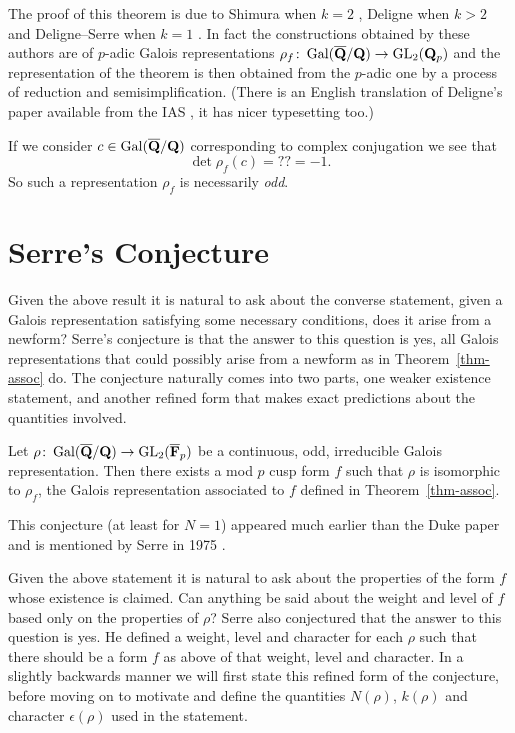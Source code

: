 \documentclass[a4paper,12pt]{article}
\begin{document}
The proof of this theorem is due to Shimura when $k = 2$ \cite{Shimura}, Deligne when $k > 2$ \cite{Deligne} and Deligne--Serre when $k = 1$ \cite{DeligneSerre}.
In fact the constructions obtained by these authors are of $p$-adic Galois representations $\rho_f\colon \operatorname{Gal}(\overline{\mathbf{Q}}/\mathbf{Q}) \to \operatorname{GL}_2(\mathbf{Q}_p)$ and the representation of the theorem is then obtained from the $p$-adic one by a process of reduction and semisimplification. %
(There is an English translation of Deligne's paper available from the IAS \cite{DeligneEng}, it has nicer typesetting too.) %

If we consider $c\in \operatorname{Gal}(\overline{\mathbf{Q}}/\mathbf{Q})$ corresponding to complex conjugation we see that
\[
\det\rho_f(c) = ?? = -1.%
\]
So such a representation $\rho_f$ is necessarily \emph{odd}.



\section{Serre's Conjecture}
Given the above result it is natural to ask about the converse statement, given a Galois representation satisfying some necessary conditions, does it arise from a newform?
Serre's conjecture is that the answer to this question is yes, all Galois representations that could possibly arise from a newform as in Theorem~\ref{thm-assoc} do.
The conjecture naturally comes into two parts, one weaker existence statement, and another refined form that makes exact predictions about the quantities involved.

\begin{conjecture}\label{conj-qual}
Let $\rho\colon \operatorname{Gal}(\overline{\mathbf{Q}}/\mathbf{Q}) \to \operatorname{GL}_2(\overline{\mathbf{F}}_p)$ be a continuous, odd, irreducible Galois representation.
Then there exists a mod $p$ cusp form $f$ such that $\rho$ is isomorphic to $\rho_f$, the Galois representation associated to $f$ defined in Theorem~\ref{thm-assoc}.
\end{conjecture}

This conjecture (at least for $N = 1$) appeared much earlier than the Duke paper and is mentioned by Serre in 1975 \cite{Serre75}.


Given the above statement it is natural to ask about the properties of the form $f$ whose existence is claimed.
Can anything be said about the weight and level of $f$ based only on the properties of $\rho$?
Serre also conjectured that the answer to this question is yes.
He defined a weight, level and character for each $\rho$ such that there should be a form $f$ as above of that weight, level and character.
In a slightly backwards manner we will first state this refined form of the conjecture, before moving on to motivate and define the quantities $N(\rho)$, $k(\rho)$ and character $\epsilon(\rho)$ used in the statement.
\end{document}
